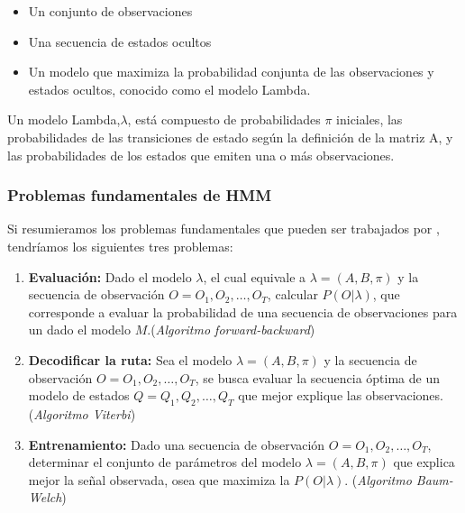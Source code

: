 \begin{itemize}
	\menorEspacioItemize
	\item Un conjunto de observaciones
	\item Una secuencia de estados ocultos
	\item Un modelo que maximiza la probabilidad conjunta de las observaciones y estados ocultos, conocido como el modelo Lambda.
\end{itemize}


Un modelo Lambda,$\lambda$, está compuesto de probabilidades $\pi$ iniciales, las probabilidades de las transiciones de estado según la definición de la matriz A, y las probabilidades de los estados que emiten una o más observaciones.








 

\subsubsection{Problemas fundamentales de HMM}

Si resumieramos los problemas fundamentales que pueden ser trabajados por \HMM, tendríamos los siguientes tres problemas:

\begin{enumerate}
	\menorEspacioItemize
	\item \textbf{Evaluación:} Dado el modelo $\lambda$, el cual equivale a $\lambda=(A,B,\pi)$ y la secuencia de observación $O = O_1,O_2,\dots,O_{T}$, calcular $P( O | \lambda)$, que corresponde a evaluar la probabilidad de una secuencia de observaciones para un \HMM dado el modelo $M$.(\emph{Algoritmo forward-backward})


	\item \textbf{Decodificar la ruta:} Sea el modelo $\lambda=(A,B,\pi)$ y la secuencia de observación $O = O_1,O_2,\dots,O_{T}$, se busca evaluar  la secuencia óptima de un modelo de estados $Q = Q_1,Q_2,\dots,Q_{T}$ que mejor explique las observaciones. (\emph{Algoritmo Viterbi})


	\item  \textbf{Entrenamiento:} Dado una secuencia de observación $O = O_1,O_2,\dots,O_{T}$,  determinar el conjunto de parámetros del modelo $\lambda=(A,B,\pi)$ que explica mejor la señal observada, osea que maximiza la $P(O|\lambda)$. (\emph{Algoritmo Baum-Welch})

\end{enumerate}




